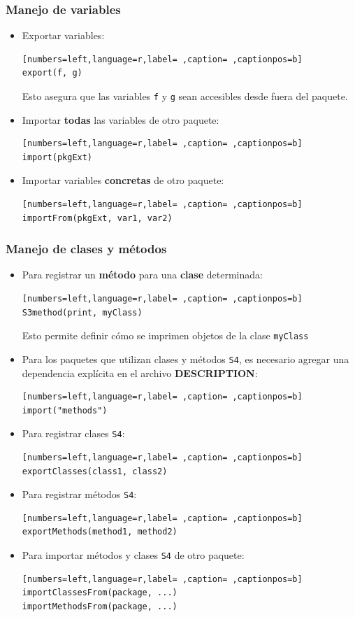 \subsubsection{Manejo de variables}
\label{sec:org0c28685}
\begin{itemize}
\item Exportar variables:
\begin{lstlisting}[numbers=left,language=r,label= ,caption= ,captionpos=b]
export(f, g)
\end{lstlisting}
Esto asegura que las variables \texttt{f} y \texttt{g} sean accesibles desde fuera del paquete.
\item Importar \textbf{todas} las variables de otro paquete:
\begin{lstlisting}[numbers=left,language=r,label= ,caption= ,captionpos=b]
import(pkgExt)
\end{lstlisting}
\item Importar variables \textbf{concretas} de otro paquete:
\begin{lstlisting}[numbers=left,language=r,label= ,caption= ,captionpos=b]
importFrom(pkgExt, var1, var2)
\end{lstlisting}
\end{itemize}
\subsubsection{Manejo de clases y métodos}
\label{sec:org5c8544a}
\begin{itemize}
\item Para registrar un \textbf{método} para una \textbf{clase} determinada:
\begin{lstlisting}[numbers=left,language=r,label= ,caption= ,captionpos=b]
S3method(print, myClass)
\end{lstlisting}
Esto permite definir cómo se imprimen objetos de la clase \texttt{myClass}
\item Para los paquetes que utilizan clases y métodos \texttt{S4}, es necesario agregar una dependencia explícita en el archivo \textbf{DESCRIPTION}:
\begin{lstlisting}[numbers=left,language=r,label= ,caption= ,captionpos=b]
import("methods")
\end{lstlisting}
\item Para registrar clases \texttt{S4}:
\begin{lstlisting}[numbers=left,language=r,label= ,caption= ,captionpos=b]
exportClasses(class1, class2)
\end{lstlisting}
\item Para registrar métodos \texttt{S4}:
\begin{lstlisting}[numbers=left,language=r,label= ,caption= ,captionpos=b]
exportMethods(method1, method2)
\end{lstlisting}
\item Para importar métodos y clases \texttt{S4} de otro paquete:
\begin{lstlisting}[numbers=left,language=r,label= ,caption= ,captionpos=b]
importClassesFrom(package, ...)
importMethodsFrom(package, ...)
\end{lstlisting}
\end{itemize}
